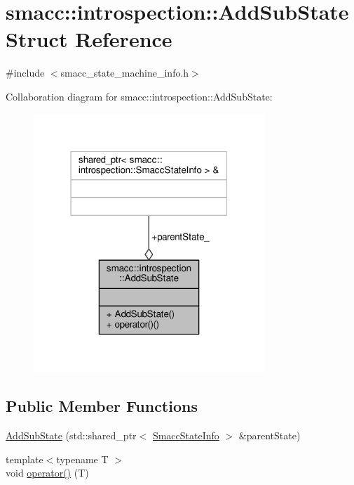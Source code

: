 \hypertarget{structsmacc_1_1introspection_1_1AddSubState}{}\section{smacc\+:\+:introspection\+:\+:Add\+Sub\+State Struct Reference}
\label{structsmacc_1_1introspection_1_1AddSubState}


{\ttfamily \#include $<$smacc\+\_\+state\+\_\+machine\+\_\+info.\+h$>$}



Collaboration diagram for smacc\+:\+:introspection\+:\+:Add\+Sub\+State\+:\nopagebreak
\begin{figure}[H]
\begin{center}
\leavevmode
\includegraphics[width=247pt]{structsmacc_1_1introspection_1_1AddSubState__coll__graph}
\end{center}
\end{figure}
\subsection*{Public Member Functions}
\begin{DoxyCompactItemize}
\item 
\hyperlink{structsmacc_1_1introspection_1_1AddSubState_a9556919fdfce601d7746c8f3efcf298b}{Add\+Sub\+State} (std\+::shared\+\_\+ptr$<$ \hyperlink{classsmacc_1_1introspection_1_1SmaccStateInfo}{Smacc\+State\+Info} $>$ \&parent\+State)
\item 
{\footnotesize template$<$typename T $>$ }\\void \hyperlink{structsmacc_1_1introspection_1_1AddSubState_aa7c4d53de4a64ef0873bde700ed7317f}{operator()} (T)
\end{DoxyCompactItemize}
